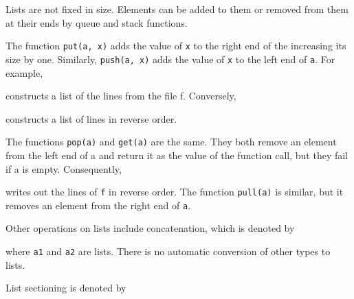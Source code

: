 Lists are not fixed in size. Elements can be added to them or removed
from them at their ends by queue and stack functions.

The function \texttt{put(a, x)} adds the value of \texttt{x} to the
right end of the increasing its size by one.  Similarly,
\texttt{push(a, x)} adds the value of \texttt{x} to the left end of
\texttt{a}. For example,



\noindent constructs a list of the lines from the file f. Conversely,



\noindent constructs a list of lines in reverse order.

The functions \texttt{pop(a)} and \texttt{get(a)} are the same. They
both remove an element from the left end of a and return it as the
value of the function call, but they fail if a is empty. Consequently,



\noindent writes out the lines of \texttt{f} in reverse order. The
function \texttt{pull(a)} is similar, but it removes an element from
the right end of \texttt{a}.

Other operations on lists include concatenation, which is denoted by



\noindent where \texttt{a1} and \texttt{a2} are lists. There is no
automatic conversion of other types to lists.

List sectioning is denoted by

